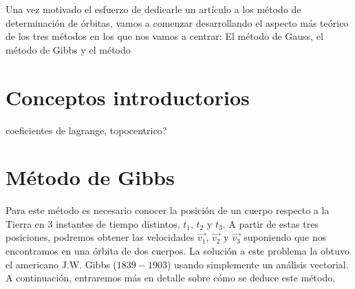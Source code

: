 \documentclass{article}
\numberwithin{equation}{section}
\begin{document}
Una vez motivado el esfuerzo de dedicarle un artículo a los 
método de determinación de órbitas, vamos a comenzar desarrollando 
el aspecto más teórico de los tres métodos en los que nos 
vamos a centrar: El método de Gauss, el método de Gibbs y 
el método %

\section{Conceptos introductorios}

coeficientes de lagrange, topocentrico?


\section{Método de Gibbs}
Para este método es necesario conocer la posición de un cuerpo 
respecto a la Tierra en 3 instantes de tiempo distintos, 
$t_{1}$, $t_{2}$ y $t_{3}$. A partir de estas tres posiciones, 
podremos obtener las velocidades $\overrightarrow{v_{1}}$, 
$\overrightarrow{v_{2}}$ y $\overrightarrow{v_{3}}$ suponiendo 
que nos encontramos en una órbita de dos cuerpos. La solución a 
este problema la obtuvo el americano J.W. Gibbs ($1839-1903$) 
usando simplemente un análisis vectorial. A continuación, 
entraremos más en detalle sobre cómo se deduce este método.
\end{document}

